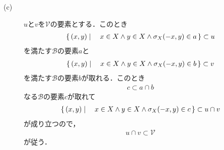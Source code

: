 \begin{description}
		\item[(c)] $u$と$v$を$\mathscr{V}$の要素とする．このとき
			\begin{align}
				\left\{\, (x,y) \mid \quad x \in X \wedge y \in X \wedge \sigma_X(-x,y) \in a\, \right\} \subset u
			\end{align}
			を満たす$\mathscr{B}$の要素$a$と
			\begin{align}
				\left\{\, (x,y) \mid \quad x \in X \wedge y \in X \wedge \sigma_X(-x,y) \in b\, \right\} \subset v
			\end{align}
			を満たす$\mathscr{B}$の要素$b$が取れる．このとき
			\begin{align}
				c \subset a \cap b
			\end{align}
			なる$\mathscr{B}$の要素$c$が取れて
			\begin{align}
				\left\{\, (x,y) \mid \quad x \in X \wedge y \in X \wedge \sigma_X(-x,y) \in c\, \right\} \subset u \cap v
			\end{align}
			が成り立つので，
			\begin{align}
				u \cap v \subset \mathscr{V}
			\end{align}
			が従う．
			

\end{description}
